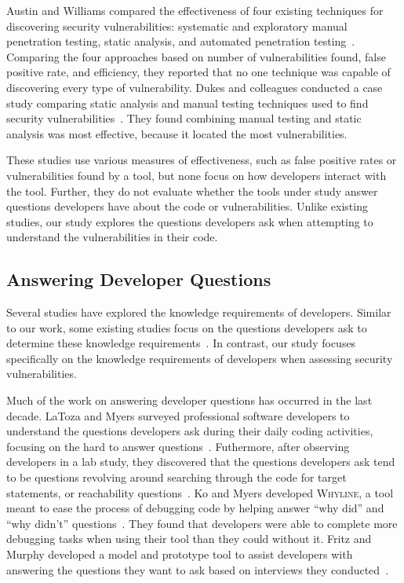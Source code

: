 \documentclass{acm_proc_article-sp}
\begin{document}
Austin and Williams compared the effectiveness of four existing techniques for discovering security vulnerabilities: systematic and exploratory manual  penetration testing, static analysis, and automated penetration testing~\cite{austin2011one}. 
Comparing the four approaches based on number of vulnerabilities found, false positive rate, and efficiency, they reported that no one technique was capable of discovering every type of vulnerability. 
Dukes and colleagues conducted a case study comparing static analysis and manual testing techniques used to find security vulnerabilities~\cite{dukes2013case}. 
They found combining manual testing and static analysis was most effective, because it located the most vulnerabilities.

These studies use various measures of effectiveness, such as false positive rates or vulnerabilities found by a tool, but none focus on how developers interact with the tool. 
Further, they do not evaluate whether the tools under study answer questions developers have about the code or vulnerabilities. 
Unlike existing studies, our study explores the questions developers ask when attempting to understand the vulnerabilities in their code.

\subsection{Answering Developer Questions}
\label{questions}
Several studies have explored the knowledge requirements of developers.
Similar to our work, some existing studies focus on the questions developers ask to determine these knowledge requirements~\cite{latoza2010hard, latoza2010developers}.
In contrast, our study focuses specifically on the knowledge requirements of developers when assessing security vulnerabilities.


Much of the work on answering developer questions has occurred in the last decade. 
LaToza and Myers surveyed professional software developers to understand the questions developers ask during their daily coding activities, focusing on the hard to answer questions~\cite{latoza2010hard}. 
Futhermore, after observing developers in a lab study, they discovered that the questions developers ask tend to be questions revolving around searching through the code for target statements, or reachability questions~\cite{latoza2010developers}. 
Ko and Myers developed \textsc{Whyline}, a tool meant to ease the process of debugging code by helping answer ``why did'' and ``why didn't'' questions~\cite{ko2004designing}. 
They found that developers were able to complete more debugging tasks when using their tool than they could without it.
Fritz and Murphy developed a model and prototype tool to assist developers with answering the questions they want to ask based on interviews they conducted~\cite{fritz2010using}.
\end{document}
